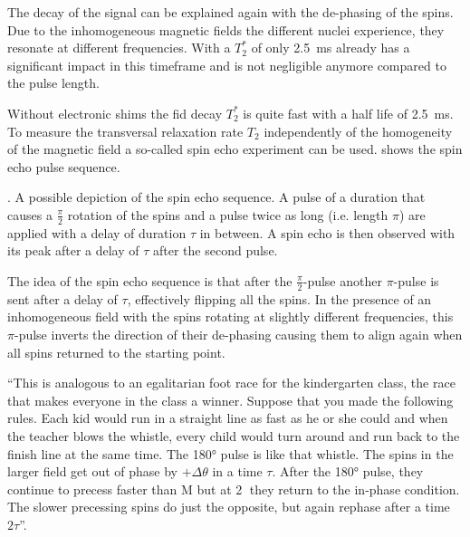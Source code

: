 The decay of the signal can be explained again with the de-phasing of the spins. Due to the inhomogeneous magnetic fields the different nuclei experience, they resonate at different frequencies. With a \(T_2^*\) of only \qty{2.5}{\milli\second} already has a significant impact in this timeframe and is not negligible anymore compared to the pulse length.

Without electronic shims the \acrshort{fid} decay \(T_2^*\) is quite fast with a half life of \qty{2.5}{\milli\second}. To measure the transversal relaxation rate \(T_2\) independently of the homogeneity of the magnetic field a so-called spin echo experiment can be used.  shows the spin echo pulse sequence.

\begin{marginfigure}
    \centering
    
    \caption{. A possible depiction of the spin echo sequence. A pulse of a duration that causes a \(\frac{\pi}{2}\) rotation of the spins and a pulse twice as long (i.e. length \(\pi\)) are applied with a delay of duration \(\tau\) in between. A spin echo is then observed with its peak after a delay of \(\tau\) after the second pulse.}
\end{marginfigure}

The idea of the spin echo sequence is that after the \(\frac{\pi}{2}\)-pulse another \(\pi\)-pulse is sent after a delay of \(\tau\), effectively flipping all the spins. In the presence of an inhomogeneous field with the spins rotating at slightly different frequencies, this \(\pi\)-pulse inverts the direction of their de-phasing causing them to align again when all spins returned to the starting point.

\enquote{This is analogous to an egalitarian foot race for the kindergarten class, the race that makes everyone in the class a winner. Suppose that you made the following rules. Each kid would run in a straight line as fast as he or she could and when the teacher blows the whistle, every child would turn around and run back to the finish line at the same time. The \ang{180} pulse is like that whistle. The spins in the larger field get out of phase by \(+\Delta\theta\) in a time \(\tau\). After the \ang{180} pulse, they continue to precess faster than M but at 2 they return to the in-phase condition. The slower precessing spins do just the opposite, but again rephase after a time \(2\tau\)}.

